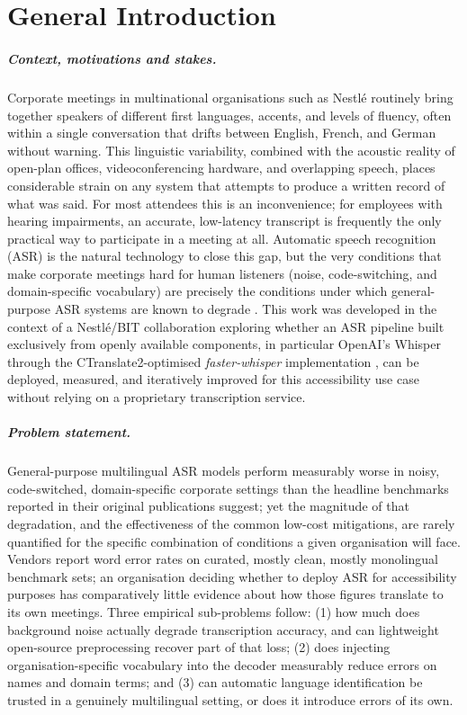 \documentclass[12pt]{report}
\begin{document}
\chapter*{General Introduction}
\thispagestyle{fancy}
\setcounter{page}{1}
\paragraph{Context, motivations and stakes.}
Corporate meetings in multinational organisations such as Nestlé routinely bring together speakers of different first languages, accents, and levels of fluency, often within a single conversation that drifts between English, French, and German without warning. This linguistic variability, combined with the acoustic reality of open-plan offices, videoconferencing hardware, and overlapping speech, places considerable strain on any system that attempts to produce a written record of what was said. For most attendees this is an inconvenience; for employees with hearing impairments, an accurate, low-latency transcript is frequently the only practical way to participate in a meeting at all. Automatic speech recognition (ASR) is the natural technology to close this gap, but the very conditions that make corporate meetings hard for human listeners (noise, code-switching, and domain-specific vocabulary) are precisely the conditions under which general-purpose ASR systems are known to degrade \cite{radford2023robust,baevski2020wav2vec}. This work was developed in the context of a Nestlé/BIT collaboration exploring whether an ASR pipeline built exclusively from openly available components, in particular OpenAI's Whisper through the CTranslate2-optimised \textit{faster-whisper} implementation \cite{fasterwhisper2023}, can be deployed, measured, and iteratively improved for this accessibility use case without relying on a proprietary transcription service.
\paragraph{Problem statement.}
General-purpose multilingual ASR models perform measurably worse in noisy, code-switched, domain-specific corporate settings than the headline benchmarks reported in their original publications suggest; yet the magnitude of that degradation, and the effectiveness of the common low-cost mitigations, are rarely quantified for the specific combination of conditions a given organisation will face. Vendors report word error rates on curated, mostly clean, mostly monolingual benchmark sets; an organisation deciding whether to deploy ASR for accessibility purposes has comparatively little evidence about how those figures translate to its own meetings. Three empirical sub-problems follow: (1) how much does background noise actually degrade transcription accuracy, and can lightweight open-source preprocessing recover part of that loss; (2) does injecting organisation-specific vocabulary into the decoder measurably reduce errors on names and domain terms; and (3) can automatic language identification be trusted in a genuinely multilingual setting, or does it introduce errors of its own.
\end{document}
